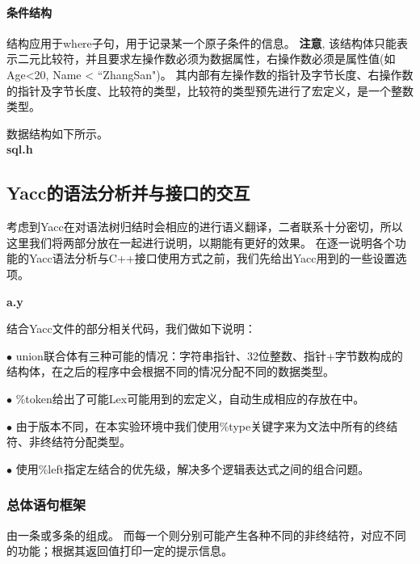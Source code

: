 \documentclass{article}
\begin{document}
\begin{spacing}{2}
            \paragraph{条件结构}
            结构应用于where子句，用于记录某一个原子条件的信息。
            \textbf{注意}, 该结构体只能表示二元比较符，并且要求左操作数必须为数据属性，右操作数必须是属性值(如Age<20, Name < ``ZhangSan")。
            其内部有左操作数的指针及字节长度、右操作数的指针及字节长度、比较符的类型，比较符的类型预先进行了宏定义，是一个整数类型。

            数据结构如下所示。\\
            \textbf{sql.h}
            \begin{spacing}{1.15}
            
            \end{spacing}
    \subsection{Yacc的语法分析并与接口的交互}
        考虑到Yacc在对语法树归结时会相应的进行语义翻译，二者联系十分密切，所以这里我们将两部分放在一起进行说明，以期能有更好的效果。
        在逐一说明各个功能的Yacc语法分析与C++接口使用方式之前，我们先给出Yacc用到的一些设置选项。

        \textbf{a.y}

        \begin{spacing}{1.15}
        
        \end{spacing}

        结合Yacc文件的部分相关代码，我们做如下说明：

            \indent \indent $\bullet$ union联合体有三种可能的情况：字符串指针、32位整数、指针+字节数构成的结构体，在之后的程序中会根据不同的情况分配不同的数据类型。

            \indent \indent $\bullet$ \%token给出了可能Lex可能用到的宏定义，自动生成相应的存放在中。

            \indent \indent $\bullet$ 由于版本不同，在本实验环境中我们使用\%type关键字来为文法中所有的终结符、非终结符分配类型。

            \indent \indent $\bullet$ 使用\%left指定左结合的优先级，解决多个逻辑表达式之间的组合问题。
        
        \subsubsection{总体语句框架}
            由一条或多条的组成。
            而每一个则分别可能产生各种不同的非终结符，对应不同的功能；根据其返回值打印一定的提示信息。


\end{spacing}
\end{document}
